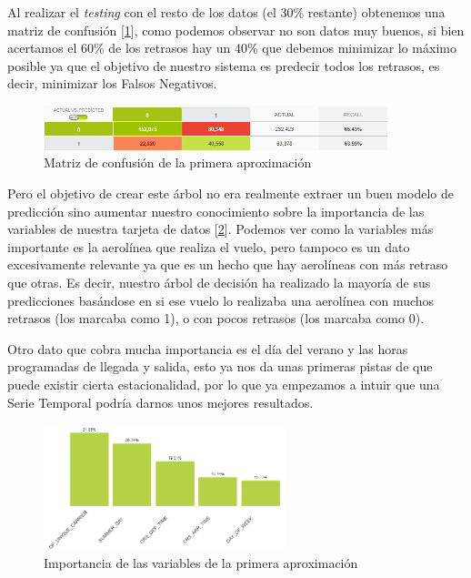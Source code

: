 \documentclass[format=acmsmall, review=false, screen=true]{acmart}
\begin{document}
Al realizar el \emph{testing} con el resto de los datos (el 30\% restante) obtenemos una matriz de confusión [\ref{fig:ConfMatrixAprox1}], como podemos observar no son datos muy buenos, si bien acertamos el 60\% de los retrasos hay un 40\% que debemos minimizar lo máximo posible ya que el objetivo de nuestro sistema es predecir todos los retrasos, es decir, minimizar los Falsos Negativos. 

\begin{figure}[htb]
	\centering
	\includegraphics[width=10cm]{ConfMatrixAprox1.png}
	\caption{Matriz de confusión de la primera aproximación}
	\label{fig:ConfMatrixAprox1}
\end{figure}

Pero el objetivo de crear este árbol no era realmente extraer un buen modelo de predicción sino aumentar nuestro conocimiento sobre la importancia de las variables de nuestra tarjeta de datos [\ref{fig:ImportanciaAprox1}]. Podemos ver como la variables más importante es la aerolínea que realiza el vuelo, pero tampoco es un dato excesivamente relevante ya que es un hecho que hay aerolíneas con más retraso que otras. Es decir, nuestro árbol de decisión ha realizado la mayoría de sus predicciones basándose en si ese vuelo lo realizaba una aerolínea con muchos retrasos (los marcaba como 1), o con pocos retrasos (los marcaba como 0).

Otro dato que cobra mucha importancia es el día del verano y las horas programadas de llegada y salida, esto ya nos da unas primeras pistas de que puede existir cierta estacionalidad, por lo que ya empezamos a intuir que una Serie Temporal podría darnos unos mejores resultados.

\begin{figure}[htb]
	\centering
	\includegraphics[width=7cm]{ImportanciaAprox1.png}
	\caption{Importancia de las variables de la primera aproximación}
	\label{fig:ImportanciaAprox1}
\end{figure}
\end{document}
